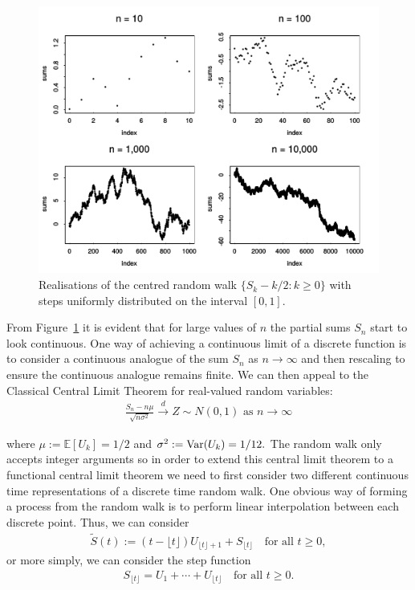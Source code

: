 \documentclass[honours,12pt,twoside, openright]{unswthesis}
\newcommand{\E}{\mathbb{E}}
\newcommand{\1}{\mathbf 1}
\newcommand{\Var}{\mathop{\rm Var}}
\numberwithin{equation}{section}
\theoremstyle{definition}
\theoremstyle{remark}
\begin{document}
\begin{figure}[h]
\centering
\includegraphics[scale=1]{Figures/RandomWalk}
\caption{\cite{Whitt2010} Realisations of the centred random walk $\{S_k-k/2:k\geq0\}$ with steps uniformly distributed on the interval $[0,1]$.}
\label{fig:RandomWalk}
\end{figure}

\noindent From Figure~\ref{fig:RandomWalk} it is evident that for large values of $n$ the partial sums $S_n$ start to look continuous. One way of achieving a continuous limit of a discrete function is to consider a continuous analogue of the sum $S_n$ as $n\to\infty$ and then rescaling to ensure the continuous analogue remains finite. We can then appeal to the Classical Central Limit Theorem for real-valued random variables: %
\begin{align}\label{eq:clt}
\frac{S_n-n\mu}{\sqrt{n\sigma^2}}\overset{d}{\longrightarrow}Z\sim N(0,1)\textrm{ as $n\to\infty$}
\end{align}

\noindent where $\mu:=\E[U_k]=1/2$ and $\sigma^2:=\Var(U_k)=1/12.$
The random walk only accepts integer arguments so in order to extend this central limit theorem to a functional central limit theorem we need to first consider two different continuous time representations of a discrete time random walk. One obvious way of forming a process from the random walk is to perform linear interpolation between each discrete point. Thus, we can consider
\begin{align}
	\tilde{S}(t):=(t-\lfloor t \rfloor)U_{\lfloor t \rfloor +1} + S_{\lfloor t \rfloor}\quad\textrm{for all } t\geq0,
\end{align}
or more simply, we can consider the step function
\begin{align}\label{fun:step}
	S_{\lfloor t \rfloor}=U_1+\cdots+U_{\lfloor t \rfloor}  \quad\textrm{for all } t\geq0.
\end{align}
\end{document}
